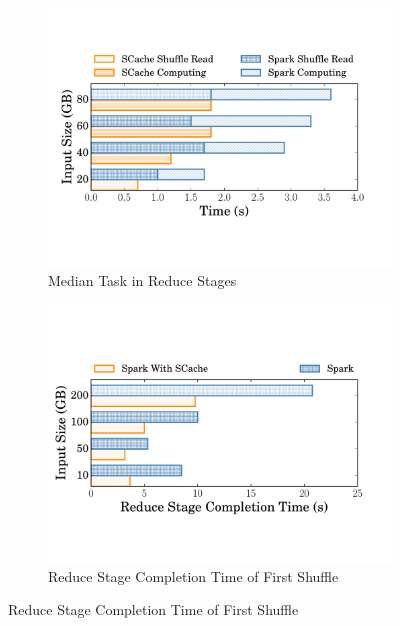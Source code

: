 \begin{figure}
\begin{minipage}[b]{.32\linewidth}
\begin{subfigure}{\linewidth}
			\begin{minipage}{\linewidth}
				\includegraphics[width=\linewidth]{fig/groupbyreducetask}
				\caption{Median Task in Reduce Stages}
				\label{fig:reducetask}
			\end{minipage}
		\end{subfigure}
		\caption{Median Task Completion Time of Single Shuffle Test}
		\label{fig:singleshuffletask}
	\end{minipage}	
	\begin{minipage}[b]{.32\linewidth}
		\begin{subfigure}{\linewidth}
			\begin{minipage}{\linewidth}
				\includegraphics[width=\linewidth]{fig/tera}
				\caption{Reduce Stage Completion Time of First Shuffle}
				\label{fig:terasort}
			\end{minipage}


\end{subfigure}
\end{minipage}
\end{figure}

